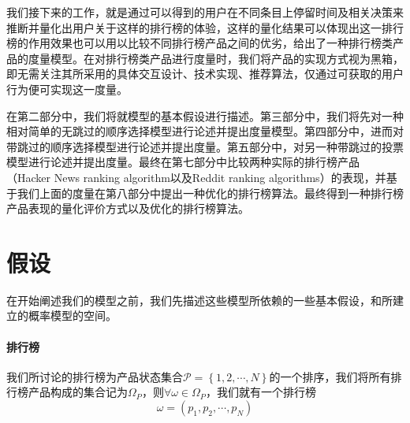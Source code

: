 \documentclass[UTF8]{ctexart}
\theoremstyle{plain}
\theoremstyle{definition}
\theoremstyle{remark}
\begin{document}
    我们接下来的工作，就是通过可以得到的用户在不同条目上停留时间及相关决策来推断并量化出用户关于这样的排行榜的体验，这样的量化结果可以体现出这一排行榜的作用效果也可以用以比较不同排行榜产品之间的优劣，给出了一种排行榜类产品的度量模型。在对排行榜类产品进行度量时，我们将产品的实现方式视为黑箱，即无需关注其所采用的具体交互设计、技术实现、推荐算法，仅通过可获取的用户行为便可实现这一度量。

    在第二部分中，我们将就模型的基本假设进行描述。第三部分中，我们将先对一种相对简单的无跳过的顺序选择模型进行论述并提出度量模型。第四部分中，进而对带跳过的顺序选择模型进行论述并提出度量。第五部分中，对另一种带跳过的投票模型进行论述并提出度量。最终在第七部分中比较两种实际的排行榜产品（Hacker News ranking algorithm以及Reddit ranking algorithms）的表现，并基于我们上面的度量在第八部分中提出一种优化的排行榜算法。最终得到一种排行榜产品表现的量化评价方式以及优化的排行榜算法。

	\section{假设}
	在开始阐述我们的模型之前，我们先描述这些模型所依赖的一些基本假设，和所建立的概率模型的空间。
	\paragraph{排行榜} 我们所讨论的排行榜为产品状态集合$\mathcal{P}=\left\{1,2,\cdots,N \right\}$的一个排序，我们将所有排行榜产品构成的集合记为$\Omega_P$，则$\forall \omega \in \Omega_P$，我们就有一个排行榜
	$$
	\omega = (p_1,p_2,\cdots,p_N)
	$$
\end{document}
